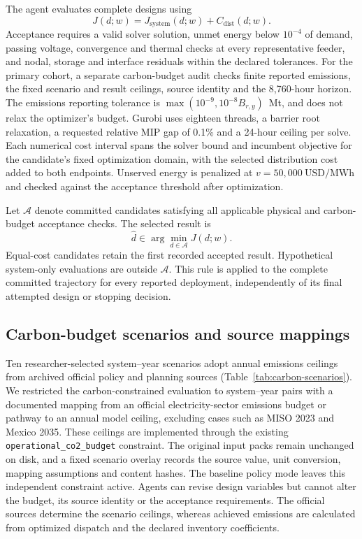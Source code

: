 \documentclass[pdflatex,sn-nature]{sn-jnl}
\newcommand{\USD}{\mathrm{USD}}
\begin{document}
The agent evaluates complete designs using
\begin{equation}
J(d;w)=J_{\mathrm{system}}(d;w)+C_{\mathrm{dist}}(d;w).
\label{eq:allin}
\end{equation}
Acceptance requires a valid solver solution, unmet energy below $10^{-4}$ of demand, passing voltage, convergence and thermal checks at every representative feeder, and nodal, storage and interface residuals within the declared tolerances. For the primary cohort, a separate carbon-budget audit checks finite reported emissions, the fixed scenario and result ceilings, source identity and the 8,760-hour horizon. The emissions reporting tolerance is $\max(10^{-9},10^{-8}B_{r,y})$~Mt, and does not relax the optimizer's budget. Gurobi uses eighteen threads, a barrier root relaxation, a requested relative MIP gap of 0.1\% and a 24-hour ceiling per solve\cite{gurobi}. Each numerical cost interval spans the solver bound and incumbent objective for the candidate's fixed optimization domain, with the selected distribution cost added to both endpoints. Unserved energy is penalized at $v=50{,}000\ \USD/\mathrm{MWh}$ and checked against the acceptance threshold after optimization.

Let $\mathcal{A}$ denote committed candidates satisfying all applicable physical and carbon-budget acceptance checks. The selected result is
\begin{equation}
\hat d\in\arg\min_{d\in\mathcal{A}}J(d;w).
\label{eq:selection}
\end{equation}
Equal-cost candidates retain the first recorded accepted result. Hypothetical system-only evaluations are outside $\mathcal{A}$. This rule is applied to the complete committed trajectory for every reported deployment, independently of its final attempted design or stopping decision.


\subsection{Carbon-budget scenarios and source mappings}\label{sec:carbon-scenarios}
Ten researcher-selected system--year scenarios adopt annual emissions ceilings from archived official policy and planning sources (Table~\ref{tab:carbon-scenarios}). We restricted the carbon-constrained evaluation to system--year pairs with a documented mapping from an official electricity-sector emissions budget or pathway to an annual model ceiling, excluding cases such as MISO 2023 and Mexico 2035. These ceilings are implemented through the existing \texttt{operational\_co2\_budget} constraint. The original input packs remain unchanged on disk, and a fixed scenario overlay records the source value, unit conversion, mapping assumptions and content hashes. The baseline policy mode leaves this independent constraint active. Agents can revise design variables but cannot alter the budget, its source identity or the acceptance requirements. The official sources determine the scenario ceilings, whereas achieved emissions are calculated from optimized dispatch and the declared inventory coefficients.
\end{document}
